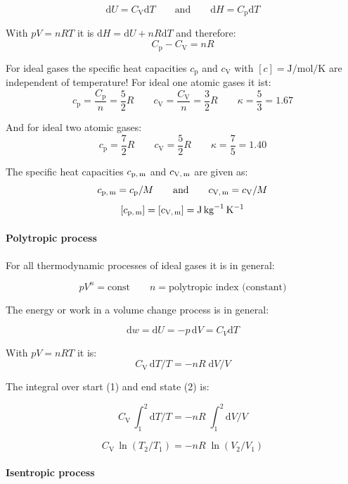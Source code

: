 \documentclass[11pt,a4paper,english,twoside]{scrreprt}
\begin{document}
\begin{equation}
  \label{eqn:heat_capacities}
  \mathrm{d}U = C_\text{V}\mathrm{d}T   \qquad  \mbox{and}   \qquad \mathrm{d}H = C_\text{p}\mathrm{d}T
\end{equation}

With $pV=nRT$ it is $\mathrm{d}H=\mathrm{d}U+nR\mathrm{d}T$ and therefore:
\[C_\text{p} - C_\text{V} = nR\]

For ideal gases the specific heat capacities $c_\text{p}$ and $c_\text{V}$ with $[c] = \si{\joule\per\mole\per\kelvin}$ are independent of temperature! For ideal one atomic gases it ist:
\[c_\text{p} = \frac{C_\text{p}}{n} = \frac 52 R \qquad c_\text{V} = \frac{C_\text{V}}{n} = \frac 32 R \qquad \kappa = \frac 53 = \num{1.67}\]

And for ideal two atomic gases:
\[c_\text{p} = \frac 72 R \qquad c_\text{V} =\frac 52 R \qquad \kappa = \frac 75 = \num{1.40}\]


The specific heat capacities $c_\text{p,\,m}$ and $c_\text{V,\,m}$ are given as:
\[c_\text{p,\,m} = c_\text{p} / M \qquad \mbox{and} \qquad c_\text{V,\,m} = c_\text{V} / M \]
\[[c_\text{p,\,m}]=[c_\text{V,\,m}] = \si{ \joule\per\kilo\gram\per\kelvin} \]



\paragraph{Polytropic process}

For all thermodynamic processes of ideal gases it is in general:

\[pV^{n}  = \text{const}   \qquad n = \text{polytropic index (constant)}\]


The energy or work in a volume change process is in general:

\[\mathrm{d}w = \mathrm{d}U = -p\, \mathrm{d}V = C_{V} \mathrm{d}T\]


With $pV=nRT$ it is:
\[C_\text{V} \, \mathrm{d}T/T=-nR\; \mathrm{d}V/V\]


The integral over start (1) and end state (2) is:

\[C_\text{V} \, \int _{1}^{2}\mathrm{d}T/T =-nR\; \int _{1}^{2}\mathrm{d}V/V \]

\[C_\text{V} \, \ln \left(T_2 /T_1 \right)=-nR\; \ln \left(V_2 /V_1 \right)\]



\paragraph{Isentropic process}
\end{document}
